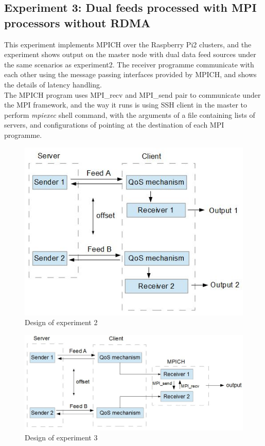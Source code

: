 \documentclass[11pt,openright,a4paper]{report}
\begin{document}
\subsection{Experiment 3: Dual feeds processed with MPI processors without RDMA}
This experiment implements MPICH over the Raspberry Pi2 clusters, and the experiment shows output on the master node with dual data feed sources under the same scenarios as experiment2. The receiver programme communicate with each other using the message passing interfaces provided by MPICH, and shows the details of latency handling.\\
The MPICH program uses MPI\_recv and MPI\_send pair to communicate under the MPI framework, and the way it runs is using SSH client in the master to perform \textit{mpiexec} shell command, with the arguments of a file containing lists of servers, and configurations of pointing at the destination of each MPI programme.\\
\begin{figure}[H]
\centering
\includegraphics[width=0.7\linewidth]{picture/Exp2}
\caption{Design of experiment 2}
\label{fig:Exp2}
\end{figure}

\begin{figure}[H]
\centering
\includegraphics[width=0.8\linewidth]{picture/exp3}
\caption{Design of experiment 3}
\label{fig:exp3}
\end{figure}
\end{document}
